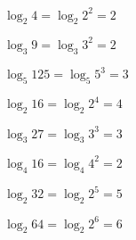 \begin{multicols}{2}
\begin{rlist}
\item $ \log_2{4}=\log_2{2^2}=2 $
\item $ \log_3{9}=\log_3{3^2}=2 $
\item $ \log_5{125}=\log_5{5^3}=3 $
\item $ \log_2{16}=\log_2{2^4}=4 $
\item $ \log_3{27}=\log_3{3^3}=3 $
\item $ \log_4{16}=\log_4{4^2}=2 $
\item $ \log_2{32}=\log_2{2^5}=5 $
\item $ \log_2{64}=\log_2{2^6}=6 $
\end{rlist}
\end{multicols}
